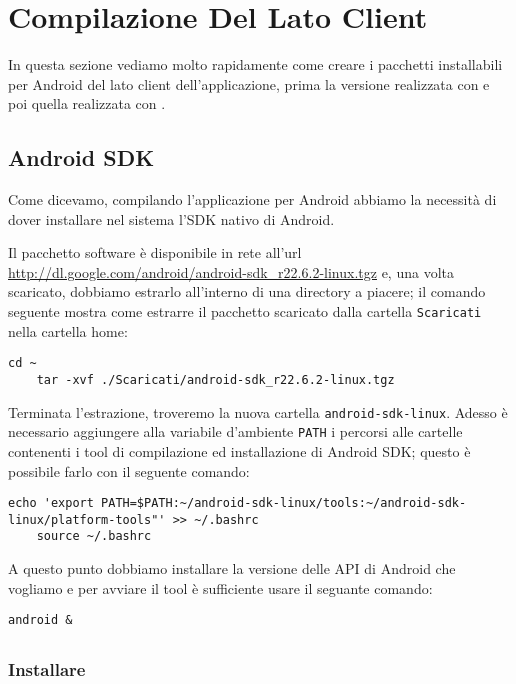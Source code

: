 \chapter{Compilazione Del Lato Client}

In questa sezione vediamo molto rapidamente come creare i pacchetti installabili
per Android del lato client dell'applicazione, prima la versione realizzata con
\pg{} e poi quella realizzata con \tisdk{}.

\section{Android SDK}
    Come dicevamo, compilando l'applicazione per Android abbiamo la necessità di
    dover installare nel sistema l'SDK nativo di Android.
    
    Il pacchetto software è disponibile in rete all'url
    \url{http://dl.google.com/android/android-sdk_r22.6.2-linux.tgz} e, una
    volta scaricato, dobbiamo estrarlo all'interno di una directory a piacere;
    il comando seguente mostra come estrarre il pacchetto scaricato dalla 
    cartella \texttt{Scaricati} nella cartella home:
    \begin{lstlisting}[language=plane]
    cd ~
    tar -xvf ./Scaricati/android-sdk_r22.6.2-linux.tgz
    \end{lstlisting}
    Terminata l'estrazione, troveremo la nuova cartella
    \texttt{android-sdk-linux}. Adesso è necessario aggiungere alla 
    variabile d'ambiente \texttt{PATH} i percorsi alle cartelle contenenti i 
    tool di compilazione ed installazione di Android SDK; questo è possibile 
    farlo con il seguente comando:
    \begin{lstlisting}[language=plane]
    echo 'export PATH=$PATH:~/android-sdk-linux/tools:~/android-sdk-linux/platform-tools"' >> ~/.bashrc
    source ~/.bashrc
    \end{lstlisting}
    A questo punto dobbiamo installare la versione delle API di Android che 
    vogliamo e per avviare il tool è sufficiente usare il seguante comando:
    \begin{lstlisting}[language=plane]
    android &
    \end{lstlisting}
    
    
\section{\pg{}}

    \subsection{Installare \pg{}}

